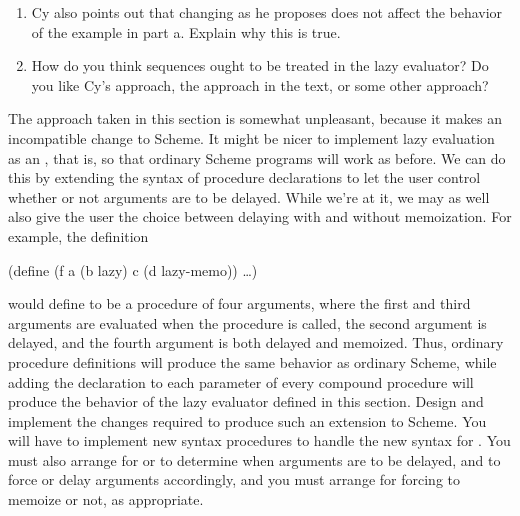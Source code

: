 \begin{exercise}
\begin{enumerate}[label = \alph*., leftmargin = *]
\begin{scheme}
			  (define (p2 x)
			    (define (p e)
			      e
			      x)
			    (p (set! x (cons x '(2)))))
			\end{scheme}
			What are the values of  and  with the original ?
			What would the values be with Cy’s proposed change to ?

		\item
			Cy also points out that changing  as he proposes does not affect the behavior of the example in part a.
			Explain why this is true.

		\item
			How do you think sequences ought to be treated in the lazy evaluator?
			Do you like Cy’s approach, the approach in the text, or some other approach?

	\end{enumerate}
\end{exercise}



\begin{exercise}
	\label{Exercise 4.31}
	The approach taken in this section is somewhat unpleasant, because it makes an incompatible change to Scheme.
	It might be nicer to implement lazy evaluation as an , that is, so that ordinary Scheme programs will work as before.
	We can do this by extending the syntax of procedure declarations to let the user control whether or not arguments are to be delayed.
	While we’re at it, we may as well also give the user the choice between delaying with and without memoization.
	For example, the definition
	\begin{scheme}
	  (define (f a (b lazy) c (d lazy-memo))
	    …)
	\end{scheme}
	would define  to be a procedure of four arguments, where the first and third arguments are evaluated when the procedure is called, the second argument is delayed, and the fourth argument is both delayed and memoized.
	Thus, ordinary procedure definitions will produce the same behavior as ordinary Scheme, while adding the  declaration to each parameter of every compound procedure will produce the behavior of the lazy evaluator defined in this section.
	Design and implement the changes required to produce such an extension to Scheme.
	You will have to implement new syntax procedures to handle the new syntax for .
	You must also arrange for  or  to determine when arguments are to be delayed, and to force or delay arguments accordingly, and you must arrange for forcing to memoize or not, as appropriate.
\end{exercise}
